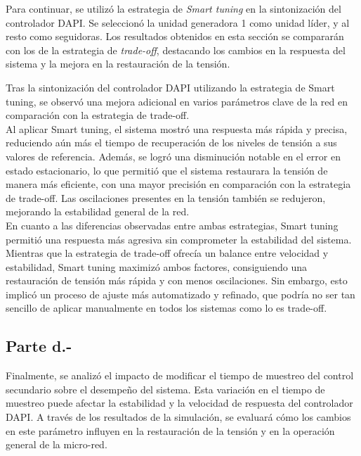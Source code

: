 Para continuar, se utilizó la estrategia de \textit{Smart tuning} en la sintonización del controlador DAPI. Se seleccionó la unidad generadora 1 como unidad líder, y al resto como seguidoras. Los resultados obtenidos en esta sección se compararán con los de la estrategia de \textit{trade-off}, destacando los cambios en la respuesta del sistema y la mejora en la restauración de la tensión.


Tras la sintonización del controlador DAPI utilizando la estrategia de Smart tuning, se observó una mejora adicional en varios parámetros clave de la red en comparación con la estrategia de trade-off.\\

Al aplicar Smart tuning, el sistema mostró una respuesta más rápida y precisa, reduciendo aún más el tiempo de recuperación de los niveles de tensión a sus valores de referencia. Además, se logró una disminución notable en el error en estado estacionario, lo que permitió que el sistema restaurara la tensión de manera más eficiente, con una mayor precisión en comparación con la estrategia de trade-off. Las oscilaciones presentes en la tensión también se redujeron, mejorando la estabilidad general de la red.\\

En cuanto a las diferencias observadas entre ambas estrategias, Smart tuning permitió una respuesta más agresiva sin comprometer la estabilidad del sistema. Mientras que la estrategia de trade-off ofrecía un balance entre velocidad y estabilidad, Smart tuning maximizó ambos factores, consiguiendo una restauración de tensión más rápida y con menos oscilaciones. Sin embargo, esto implicó un proceso de ajuste más automatizado y refinado, que podría no ser tan sencillo de aplicar manualmente en todos los sistemas como lo es trade-off.

\subsection{Parte d.-}

Finalmente, se analizó el impacto de modificar el tiempo de muestreo del control secundario sobre el desempeño del sistema. Esta variación en el tiempo de muestreo puede afectar la estabilidad y la velocidad de respuesta del controlador DAPI. A través de los resultados de la simulación, se evaluará cómo los cambios en este parámetro influyen en la restauración de la tensión y en la operación general de la micro-red.

